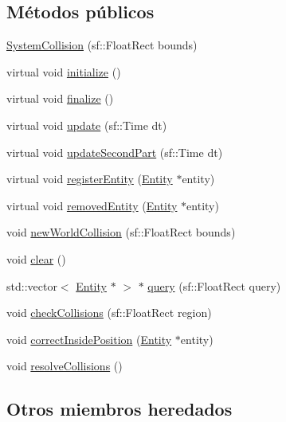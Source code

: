 \subsection*{Métodos públicos}
\begin{DoxyCompactItemize}
\item 
\hyperlink{classSystemCollision_a32a9ae61fbeda597cdd3e8cf991782f6}{System\+Collision} (sf\+::\+Float\+Rect bounds)
\item 
virtual void \hyperlink{classSystemCollision_ab2ced8fd115cd326a29a3535ddba7367}{initialize} ()
\item 
virtual void \hyperlink{classSystemCollision_a8c8ae9c8bb8f9f69e4b656c4ff496a30}{finalize} ()
\item 
virtual void \hyperlink{classSystemCollision_ab2dae21a0636bf6d24c6fd7f596f07d1}{update} (sf\+::\+Time dt)
\item 
virtual void \hyperlink{classSystemCollision_a731cd70ffedfa221454348ad975ee82c}{update\+Second\+Part} (sf\+::\+Time dt)
\item 
virtual void \hyperlink{classSystemCollision_a228a39b4c9bc3d6b7934a25814acda7a}{register\+Entity} (\hyperlink{classEntity}{Entity} $\ast$entity)
\item 
virtual void \hyperlink{classSystemCollision_a8890b0a585ac5e9a99510839a9713de4}{removed\+Entity} (\hyperlink{classEntity}{Entity} $\ast$entity)
\item 
void \hyperlink{classSystemCollision_a87344c57cc07fbc29741a8f0bf6f71ba}{new\+World\+Collision} (sf\+::\+Float\+Rect bounds)
\item 
void \hyperlink{classSystemCollision_a588abcc7ca31e3f2e23a16165f62b74d}{clear} ()
\item 
std\+::vector$<$ \hyperlink{classEntity}{Entity} $\ast$ $>$ $\ast$ \hyperlink{classSystemCollision_ac9b0781fe501dd70ce28037230a6574f}{query} (sf\+::\+Float\+Rect query)
\item 
void \hyperlink{classSystemCollision_afa60781f0a681875d053275eb78a13c9}{check\+Collisions} (sf\+::\+Float\+Rect region)
\item 
void \hyperlink{classSystemCollision_acbc4c623f1f4dd9c6def15013498ed3d}{correct\+Inside\+Position} (\hyperlink{classEntity}{Entity} $\ast$entity)
\item 
void \hyperlink{classSystemCollision_a90b827486b7e03081af461970a799adb}{resolve\+Collisions} ()
\end{DoxyCompactItemize}
\subsection*{Otros miembros heredados}



